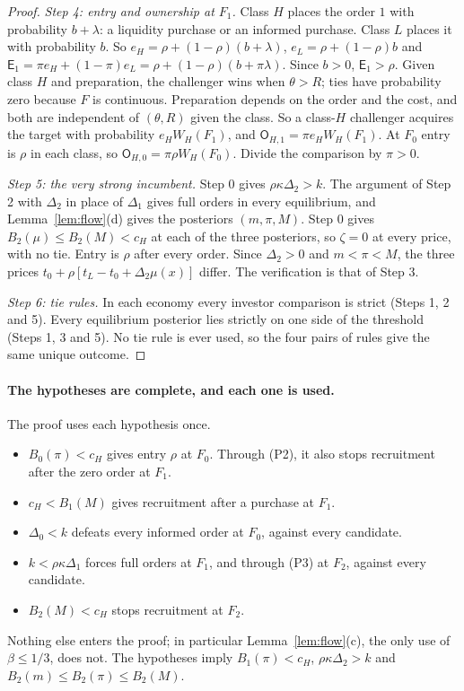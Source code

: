 \documentclass[11pt]{article}
\theoremstyle{definition}
\newcommand{\Ent}{\mathsf E}
\newcommand{\Own}{\mathsf O}
\begin{document}
\begin{proof}
\emph{Step 4: entry and ownership at $F_1$.} Class $H$ places the order $1$ with probability $b+\lambda$: a
liquidity purchase or an informed purchase. Class $L$ places it with probability $b$. So
$e_H=\rho+(1-\rho)(b+\lambda)$, $e_L=\rho+(1-\rho)b$ and $\Ent_1=\pi e_H+(1-\pi)e_L=\rho+(1-\rho)(b+\pi\lambda)$.
Since $b>0$, $\Ent_1>\rho$. Given class $H$ and preparation, the challenger wins when $\theta>R$; ties have
probability zero because $F$ is continuous. Preparation depends on the order and the cost, and both are
independent of $(\theta,R)$ given the class. So a class-$H$ challenger acquires the target with probability
$e_HW_H(F_1)$, and $\Own_{H,1}=\pi e_HW_H(F_1)$. At $F_0$ entry is $\rho$ in each class, so
$\Own_{H,0}=\pi\rho W_H(F_0)$. Divide the comparison by $\pi>0$.

\emph{Step 5: the very strong incumbent.} Step 0 gives $\rho\kappa\Delta_2>k$. The argument of Step 2 with
$\Delta_2$ in place of $\Delta_1$ gives full orders in every equilibrium, and Lemma~\ref{lem:flow}(d) gives the
posteriors $(m,\pi,M)$. Step 0 gives $B_2(\mu)\le B_2(M)<c_H$ at each of the three posteriors, so $\zeta=0$
at every price, with no tie. Entry is $\rho$ after every order. Since $\Delta_2>0$ and $m<\pi<M$, the three prices
$t_0+\rho[t_L-t_0+\Delta_2\mu(x)]$ differ. The verification is that of Step 3.

\emph{Step 6: tie rules.} In each economy every investor comparison is strict (Steps 1, 2 and 5). Every
equilibrium posterior lies strictly on one side of the threshold (Steps 1, 3 and 5). No tie rule is ever used,
so the four pairs of rules give the same unique outcome.
\end{proof}

\paragraph{The hypotheses are complete, and each one is used.} The proof uses each hypothesis once.
\begin{itemize}
\item $B_0(\pi)<c_H$ gives entry $\rho$ at $F_0$. Through (P2), it also stops recruitment after the zero order at $F_1$.
\item $c_H<B_1(M)$ gives recruitment after a purchase at $F_1$.
\item $\Delta_0<k$ defeats every informed order at $F_0$, against every candidate.
\item $k<\rho\kappa\Delta_1$ forces full orders at $F_1$, and through (P3) at $F_2$, against every candidate.
\item $B_2(M)<c_H$ stops recruitment at $F_2$.
\end{itemize}
Nothing else enters the proof; in particular Lemma~\ref{lem:flow}(c), the only use of $\beta\le1/3$, does not.
The hypotheses imply $B_1(\pi)<c_H$, $\rho\kappa\Delta_2>k$ and $B_2(m)\le B_2(\pi)\le B_2(M)$.
\end{document}
